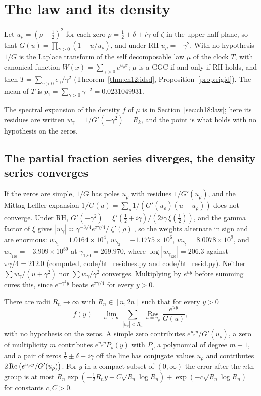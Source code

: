 \section{The law and its density}\label{ht:sec:law}

Let $u_\rho=(\rho-\tfrac12)^2$ for each zero $\rho=\tfrac12+\delta+i\gamma$ of $\zeta$ in the upper half plane, so that $G(u)=\prod_{\gamma>0}(1-u/u_\rho)$, and under RH $u_\rho=-\gamma^2$. With no hypothesis $1/G$ is the Laplace transform of the self decomposable law $\mu$ of the clock $T$, with canonical function $W(x)=\sum_{\gamma>0}e^{u_\rho x}$; $\mu$ is a GGC if and only if RH holds, and then $T=\sum_{\gamma>0}e_\gamma/\gamma^2$ (Theorem~\ref{thm:ch12:idsd}, Proposition~\ref{prop:rigid}). The mean of $T$ is $p_1=\sum_{\gamma>0}\gamma^{-2}=0.0231049931$.

The spectral expansion of the density $f$ of $\mu$ is in Section~\ref{sec:ch18:law}; here its residues are written $w_\gamma=1/G'(-\gamma^2)=R_k$, and the point is what holds with no hypothesis on the zeros.

\subsection{The partial fraction series diverges, the density series converges}

If the zeros are simple, $1/G$ has poles $u_\rho$ with residues $1/G'(u_\rho)$, and the Mittag Leffler expansion $1/G(u)=\sum_\rho1/(G'(u_\rho)(u-u_\rho))$ does not converge. Under RH, $G'(-\gamma^2)=\xi'(\tfrac12+i\gamma)/(2i\gamma\,\xi(\tfrac12))$, and the gamma factor of $\xi$ gives $|w_\gamma|\asymp\gamma^{-3/4}e^{\pi\gamma/4}/|\zeta'(\rho)|$, so the weights alternate in sign and are enormous: $w_{\gamma_1}=1.0164\times10^4$, $w_{\gamma_2}=-1.1775\times10^6$, $w_{\gamma_5}=8.0078\times10^9$, and $w_{\gamma_{120}}=-3.909\times10^{89}$ at $\gamma_{120}=269.970$, where $\log|w_{\gamma_{120}}|=206.3$ against $\pi\gamma/4=212.0$ (computed, code/ht\_residues.py and code/ht\_resid.py). Neither $\sum w_\gamma/(u+\gamma^2)$ nor $\sum w_\gamma/\gamma^2$ converges. Multiplying by $e^{uy}$ before summing cures this, since $e^{-\gamma^2y}$ beats $e^{\pi\gamma/4}$ for every $y>0$.

\begin{theorem}\label{ht:thm:grouped}
There are radii $R_n\to\infty$ with $R_n\in[n,2n]$ such that for every $y>0$
\begin{equation}\label{ht:eq:res}
f(y)=\lim_{n\to\infty}\sum_{|u_\rho|<R_n}\operatorname*{Res}_{u=u_\rho}\frac{e^{uy}}{G(u)},
\end{equation}
with no hypothesis on the zeros. A simple zero contributes $e^{u_\rho y}/G'(u_\rho)$, a zero of multiplicity $m$ contributes $e^{u_\rho y}P_\rho(y)$ with $P_\rho$ a polynomial of degree $m-1$, and a pair of zeros $\tfrac12\pm\delta+i\gamma$ off the line has conjugate values $u_\rho$ and contributes $2\operatorname{Re}\big(e^{u_\rho y}/G'(u_\rho)\big)$. For $y$ in a compact subset of $(0,\infty)$ the error after the $n$th group is at most $R_n\exp(-\tfrac12R_ny+C\sqrt{R_n}\log R_n)+\exp(-c\sqrt{R_n}\log R_n)$ for constants $c,C>0$.
\end{theorem}

